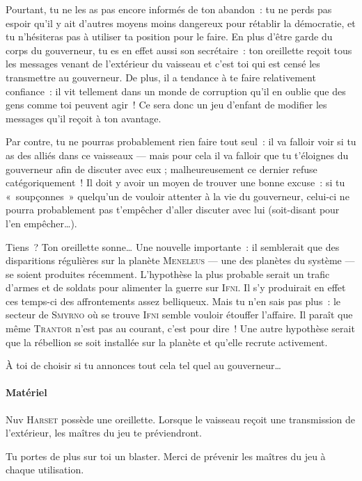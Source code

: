{{Pourtant, tu ne les as pas encore informés de ton abandon~:  tu ne perds pas espoir qu’il y ait d’autres moyens moins dangereux pour rétablir la démocratie, et tu n’hésiteras pas à utiliser ta position pour le faire.
En plus d’être garde du corps du gouverneur, tu es en effet aussi son secrétaire~:  ton oreillette reçoit tous les messages venant de l’extérieur du vaisseau et c’est toi qui est censé les transmettre au gouverneur.
De plus, il a tendance à te faire relativement confiance~:  il vit tellement dans un monde de corruption qu’il en oublie que des gens comme toi peuvent agir~!
Ce sera donc un jeu d’enfant de modifier les messages qu’il reçoit à ton avantage.

Par contre, tu ne pourras probablement rien faire tout seul~:  il va falloir voir si tu as des alliés dans ce vaisseaux — mais pour cela il va falloir que tu t’éloignes du gouverneur afin de discuter avec eux ; malheureusement ce dernier refuse catégoriquement~!
Il doit y avoir un moyen de trouver une bonne excuse~:  si tu «~soupçonnes~» quelqu’un de vouloir attenter à la vie du gouverneur, celui-ci ne pourra probablement pas t’empêcher d’aller discuter avec lui (soit-disant pour l’en empêcher…).

Tiens~?  Ton oreillette sonne…
Une nouvelle importante~:  il semblerait que des disparitions régulières sur la planète \textsc{Meneleus} — une des planètes du système — se soient produites récemment.
L’hypothèse la plus probable serait un trafic d’armes et de soldats pour alimenter la guerre sur \textsc{Ifni}.
Il s’y produirait en effet ces temps-ci des affrontements assez belliqueux.
Mais tu n’en sais pas plus~:  le secteur de \textsc{Smyrno} où se trouve \textsc{Ifni} semble vouloir étouffer l’affaire.
Il paraît que même \textsc{Trantor} n’est pas au courant, c’est pour dire~!
Une autre hypothèse serait que la rébellion se soit installée sur la planète et qu’elle recrute activement.

À toi de choisir si tu annonces tout cela tel quel au gouverneur…
}

\paragraph{Matériel}
{
Nuv \textsc{Harset} possède une oreillette.
Lorsque le vaisseau reçoit une transmission de l’extérieur, les maîtres du jeu te préviendront.

Tu portes de plus sur toi un blaster.
Merci de prévenir les maîtres du jeu à chaque utilisation.

}}

